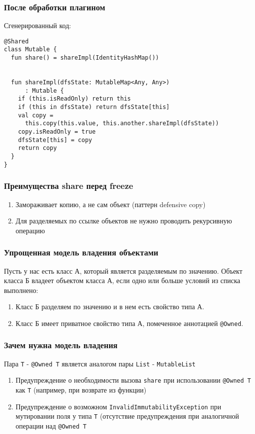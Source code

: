 \documentclass[14pt,xcolor={dvipsnames}]{beamer}
\begin{document}
\begin{frame}[fragile]
\frametitle{После обработки плагином}
Сгенерированный код:
\begin{lstlisting}[basicstyle=\fontsize{10}{1}\selectfont\ttfamily]
@Shared
class Mutable {
  fun share() = shareImpl(IdentityHashMap())
    
    
  fun shareImpl(dfsState: MutableMap<Any, Any>)
      : Mutable {
    if (this.isReadOnly) return this
	if (this in dfsState) return dfsState[this]
	val copy = 
	  this.copy(this.value, this.another.shareImpl(dfsState))
	copy.isReadOnly = true
	dfsState[this] = copy
	return copy
  }
}
\end{lstlisting}
\end{frame}


\begin{frame}
\frametitle{Преимущества share перед freeze}
\begin{enumerate}
	\item Замораживает копию, а не сам объект (паттерн defensive copy)
	\item Для разделяемых по ссылке объектов не нужно проводить рекурсивную операцию
\end{enumerate}	
\end{frame}

\begin{frame}
\frametitle{Упрощенная модель владения объектами}
Пусть у нас есть класс А, который является разделяемым по значению.
Объект класса Б владеет объектом класса А, если одно или больше условий из списка выполнено:

\begin{enumerate}
	\item Класс Б разделяем по значению и в нем есть свойство типа А.
	\item Класс Б имеет приватное свойство типа А, помеченное аннотацией \texttt{@Owned}.
\end{enumerate}
\end{frame}

\begin{frame}
\frametitle{Зачем нужна модель владения}
Пара \texttt{T} - \texttt{@Owned T} является аналогом пары \texttt{List} - \texttt{MutableList}

\begin{enumerate}
	\item Предупреждение о необходимости вызова \texttt{share} при использовании \texttt{@Owned T} как \texttt{T} (например, при возврате из функции)
	\item Предупреждение о возможном \texttt{InvalidImmutabilityException} при мутировании поля у типа \texttt{T} (отсутствие предупреждения при аналогичной операции над \texttt{@Owned T}
\end{enumerate}
\end{frame}
\end{document}
